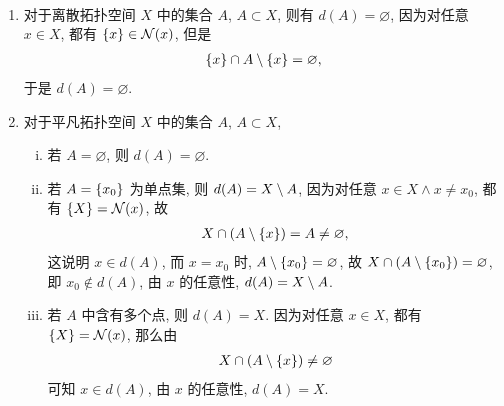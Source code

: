     \begin{Example}
        ~
        \begin{enumerate}
            \item 对于离散拓扑空间 $ X $ 中的集合 $ A $, $ A\subset X $, 则有 $ d(A)=\varnothing $, 因为对任意 $ x\in X $, 都有 $ \left\{ x \right\}\in\mathcal{N}(x) $, 但是
            \begin{align*}
                \left\{ x \right\}\cap A\setminus\left\{ x \right\}=\varnothing,
            \end{align*}
            于是 $ d(A)=\varnothing $.
            \item 对于平凡拓扑空间 $ X $ 中的集合 $ A $, $ A\subset X $,
            \begin{enumerate}[(i)]
                \item 若 $ A=\varnothing $, 则 $ d(A)=\varnothing $.
                \item 若 $ A=\left\{ x_{0} \right\} $ 为单点集, 则 $ d(A)=X\setminus A $, 因为对任意 $ x\in X \land x\ne x_{0} $, 都有 $ \left\{ X \right\}=\mathcal{N}(x) $, 故
                \begin{align*}
                    X\cap (A\setminus \left\{ x \right\})=A\ne \varnothing,
                \end{align*}
                这说明 $ x\in d(A) $, 而 $ x=x_{0} $ 时, $ A\setminus\left\{ x_{0} \right\}=\varnothing $, 故 $ X\cap (A\setminus \left\{ x_{0} \right\})=\varnothing $, 即 $ x_{0}\notin d(A) $, 由 $ x $ 的任意性, $ d(A)=X\setminus A $.
                \item 若 $ A $ 中含有多个点, 则 $ d(A)=X $. 因为对任意 $ x\in X $, 都有 $ \left\{ X \right\}=\mathcal{N}(x) $, 那么由
                \begin{align*}
                    X\cap (A\setminus\left\{ x \right\})\ne \varnothing
                \end{align*}
                可知 $ x\in d(A) $, 由 $ x $ 的任意性, $ d(A)=X $.
            \end{enumerate}
        \end{enumerate}
    \end{Example}

